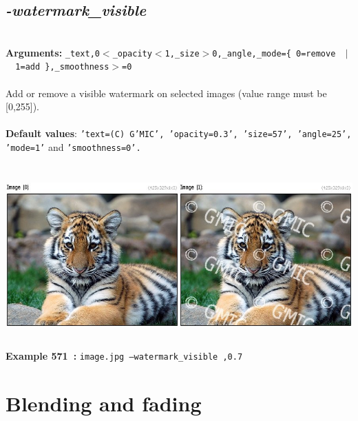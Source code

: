\documentclass[a4paper,11pt,twoside]{book}
\begin{document}
\subsection{\emph{-watermark\_visible} }\vspace*{-0.5em}
~\\\textbf{Arguments: } 
{\small \texttt{\_text,0$<$\_opacity$<$1,\_size$>$0,\_angle,\_mode=\{ 0=remove ~$|$~ 1=add \},\_smoothness$>$=0}}\\~\\
Add or remove a visible watermark on selected images (value range must be [0,255]).
~\\~\\\textbf{Default values}: {\small \texttt{'text=(C) G'MIC', 'opacity=0.3', 'size=57', 'angle=25', 'mode=1'} and \texttt{'smoothness=0'.}}
\begin{center}\includegraphics[keepaspectratio=true,height=7cm,width=\textwidth]{img/gmic_def571.jpg}\\
{\footnotesize \textbf{Example 571~:} \texttt{image.jpg --watermark\_visible ,0.7}}
\end{center}
\section{Blending and fading}
\end{document}
